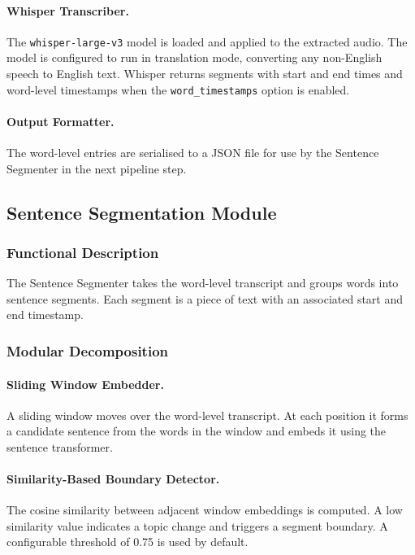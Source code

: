 \documentclass[12pt, a4paper]{report}
\begin{document}
\paragraph{Whisper Transcriber.}
The \texttt{whisper-large-v3} model is loaded and applied to the extracted
audio. The model is configured to run in translation mode, converting any
non-English speech to English text. Whisper returns segments with start
and end times and word-level timestamps when the \texttt{word\_timestamps}
option is enabled.

\paragraph{Output Formatter.}
The word-level entries are serialised to a JSON file for use by the
Sentence Segmenter in the next pipeline step.

\subsection{Sentence Segmentation Module}

\subsubsection{Functional Description}

The Sentence Segmenter takes the word-level transcript and groups words
into sentence segments. Each segment is a piece of text with an associated
start and end timestamp.

\subsubsection{Modular Decomposition}

\paragraph{Sliding Window Embedder.}
A sliding window moves over the word-level transcript. At each position it
forms a candidate sentence from the words in the window and embeds it using
the sentence transformer.

\paragraph{Similarity-Based Boundary Detector.}
The cosine similarity between adjacent window embeddings is computed. A
low similarity value indicates a topic change and triggers a segment
boundary. A configurable threshold of 0.75 is used by default.
\end{document}
